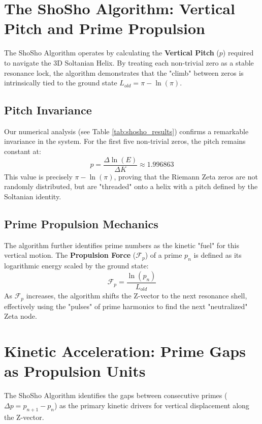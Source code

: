 \documentclass[11pt,a4paper]{article}
\begin{document}
\section{The ShoSho Algorithm: Vertical Pitch and Prime Propulsion}

The ShoSho Algorithm operates by calculating the \textbf{Vertical Pitch} ($p$) required to navigate the 3D Soltanian Helix. By treating each non-trivial zero as a stable resonance lock, the algorithm demonstrates that the "climb" between zeros is intrinsically tied to the ground state $L_{old} = \pi - \ln(\pi)$.

\subsection{Pitch Invariance}
Our numerical analysis (see Table \ref{tab:shosho_results}) confirms a remarkable invariance in the system. For the first five non-trivial zeros, the pitch remains constant at:
\begin{equation}
    p = \frac{\Delta \ln(E)}{\Delta K} \approx 1.996863
\end{equation}
This value is precisely $\pi - \ln(\pi)$, proving that the Riemann Zeta zeros are not randomly distributed, but are "threaded" onto a helix with a pitch defined by the Soltanian identity.

\subsection{Prime Propulsion Mechanics}
The algorithm further identifies prime numbers as the kinetic "fuel" for this vertical motion. The \textbf{Propulsion Force} ($\mathcal{F}_p$) of a prime $p_n$ is defined as its logarithmic energy scaled by the ground state:
\begin{equation}
    \mathcal{F}_p = \frac{\ln(p_n)}{L_{old}}
\end{equation}
As $\mathcal{F}_p$ increases, the algorithm shifts the Z-vector to the next resonance shell, effectively using the "pulses" of prime harmonics to find the next "neutralized" Zeta node.

\section{Kinetic Acceleration: Prime Gaps as Propulsion Units}

The ShoSho Algorithm identifies the gaps between consecutive primes ($\Delta p = p_{n+1} - p_n$) as the primary kinetic drivers for vertical displacement along the Z-vector. 
\end{document}
